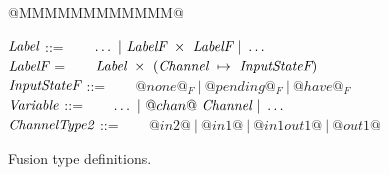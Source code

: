 
\begin{figure}

\begin{tabbing}
@MMMMMMMMMMMM@   \TABDEF \kill

$\textit{Label}$        \> ::=  \> ~~~ $\ldots ~|~\textit{LabelF}~\times~\textit{LabelF} ~|~ \ldots$ \\
$\textit{LabelF}$       \> =    \> ~~~ $\textit{Label}~\times~(\textit{Channel} ~\mapsto~ \textit{InputStateF})$  \\
$\textit{InputStateF}$  \> ::=  \> ~~~ $@none@_F ~|~ @pending@_F ~|~ @have@_F$    \\
$\textit{Variable}$          \> ::=  \> ~~~ $\ldots ~|~@chan@~\textit{Channel} ~|~ \ldots$ \\
$\textit{ChannelType2}$  \> ::=  \> ~~~ $@in2@~|~@in1@~|~@in1out1@~|~@out1@$
\end{tabbing}
\caption{Fusion type definitions.}
\label{fig:Fusion:Types}
\end{figure}


